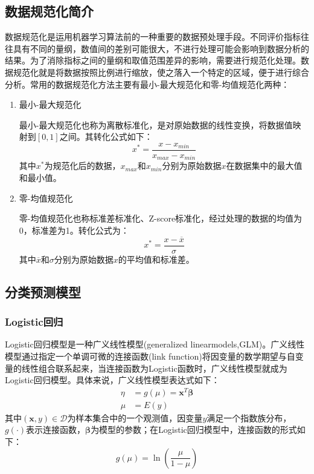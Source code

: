 \documentclass[a4paper]{ctexart}
\begin{document}
\subsection{数据规范化简介}\label{sec:数据规范化}
数据规范化是运用机器学习算法前的一种重要的数据预处理手段。不同评价指标往往具有不同的量纲，数值间的差别可能很大，不进行处理可能会影响到数据分析的结果。为了消除指标之间的量纲和取值范围差异的影响，需要进行规范化处理。数据规范化就是将数据按照比例进行缩放，使之落入一个特定的区域，便于进行综合分析。常用的数据规范化方法主要有最小-最大规范化和零-均值规范化两种：
\begin{enumerate}
	\item 最小-最大规范化

	      最小-最大规范化也称为离散标准化，是对原始数据的线性变换，将数据值映射到$\left[0, 1\right]$之间。其转化公式如下：
	      \begin{equation}
		      x^*=\frac{x-x_{min}}{x_{max}-x_{min}}
	      \end{equation}
	      其中$x^*$为规范化后的数据，$x_{max}$和$x_{min}$分别为原始数据$x$在数据集中的最大值和最小值。

	\item 零-均值规范化

	      零-均值规范化也称标准差标准化、Z-score标准化，经过处理的数据的均值为0，标准差为1。转化公式为：
	      \begin{equation}\label{eq:Z-score标准化公式}
		      x^*=\frac{x-\overline{x}}{\sigma}
	      \end{equation}
	      其中$\overline{x}$和$\sigma$分别为原始数据$x$的平均值和标准差。
\end{enumerate}


\subsection{分类预测模型}
\subsubsection{Logistic回归}
Logistic回归模型是一种广义线性模型(generalized linearmodels,GLM)\cite{RN91}。广义线性模型通过指定一个单调可微的连接函数(link function)将因变量的数学期望与自变量的线性组合联系起来，当连接函数为Logistic函数时，广义线性模型就成为Logistic回归模型。具体来说，广义线性模型表达式如下\cite{RN92,RN1}：
\begin{equation}\label{eq:逻辑回归公式}
	\begin{split}
		\eta&=g(\mu)=\bm x^T\bm\beta\\
		\mu&=E(y)
	\end{split}
\end{equation}
其中$(\bm x,y)\in \mathcal{D}$为样本集合中的一个观测值，因变量$y$满足一个指数族分布，$g(\cdot)$表示连接函数，$\bm\beta$为模型的参数；在Logistic回归模型中，连接函数的形式如下\cite{RN94}：
\begin{equation}
	g(\mu)=\ln\left(\frac{\mu}{1-\mu}\right)
\end{equation}
\end{document}

